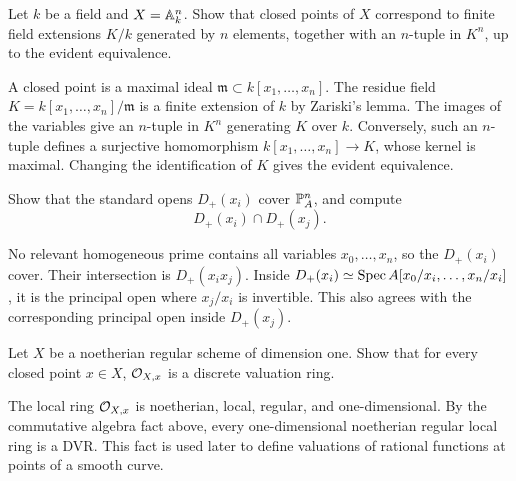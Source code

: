 \begin{exercise}\label{ex:closed-points-affine}
Let \(k\) be a field and \(X=\AA^n_k\).  Show that closed points of \(X\)
correspond to finite field extensions \(K/k\) generated by \(n\) elements,
together with an \(n\)-tuple in \(K^n\), up to the evident equivalence.
\end{exercise}

\begin{solution}
A closed point is a maximal ideal \(\mathfrak m\subset k[x_1,\ldots,x_n]\).
The residue field \(K=k[x_1,\ldots,x_n]/\mathfrak m\) is a finite extension of
\(k\) by Zariski's lemma.  The images of the variables give an \(n\)-tuple in
\(K^n\) generating \(K\) over \(k\).  Conversely, such an \(n\)-tuple defines a
surjective homomorphism \(k[x_1,\ldots,x_n]\to K\), whose kernel is maximal.
Changing the identification of \(K\) gives the evident equivalence.
\end{solution}

\begin{exercise}\label{ex:standard-cover}
Show that the standard opens \(D_+(x_i)\) cover \(\PP^n_A\), and compute
\[
    D_+(x_i)\cap D_+(x_j).
\]
\end{exercise}

\begin{solution}
No relevant homogeneous prime contains all variables \(x_0,\ldots,x_n\), so
the \(D_+(x_i)\) cover.  Their intersection is \(D_+(x_ix_j)\).  Inside
\(D_+(x_i)\simeq\Spec A[x_0/x_i,\ldots,x_n/x_i]\), it is the principal open
where \(x_j/x_i\) is invertible.  This also agrees with the corresponding
principal open inside \(D_+(x_j)\).
\end{solution}

\begin{exercise}\label{ex:regular-curve-dvr}
Let \(X\) be a noetherian regular scheme of dimension one.  Show that for every
closed point \(x\in X\), \(\OO_{X,x}\) is a discrete valuation ring.
\end{exercise}

\begin{solution}
The local ring \(\OO_{X,x}\) is noetherian, local, regular, and
one-dimensional.  By the commutative algebra fact above, every
one-dimensional noetherian regular local ring is a DVR.  This fact is used
later to define valuations of rational functions at points of a smooth curve.
\end{solution}

